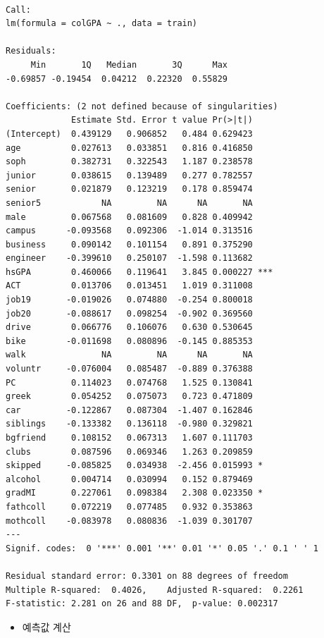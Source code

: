 \documentclass[
  letterpaper,
  DIV=11,
  numbers=noendperiod]{scrartcl}
\providecommand{\tightlist}{%
  \setlength{\itemsep}{0pt}\setlength{\parskip}{0pt}}\usepackage{longtable,booktabs,array}
\begin{document}
\begin{verbatim}

Call:
lm(formula = colGPA ~ ., data = train)

Residuals:
     Min       1Q   Median       3Q      Max 
-0.69857 -0.19454  0.04212  0.22320  0.55829 

Coefficients: (2 not defined because of singularities)
             Estimate Std. Error t value Pr(>|t|)    
(Intercept)  0.439129   0.906852   0.484 0.629423    
age          0.027613   0.033851   0.816 0.416850    
soph         0.382731   0.322543   1.187 0.238578    
junior       0.038615   0.139489   0.277 0.782557    
senior       0.021879   0.123219   0.178 0.859474    
senior5            NA         NA      NA       NA    
male         0.067568   0.081609   0.828 0.409942    
campus      -0.093568   0.092306  -1.014 0.313516    
business     0.090142   0.101154   0.891 0.375290    
engineer    -0.399610   0.250107  -1.598 0.113682    
hsGPA        0.460066   0.119641   3.845 0.000227 ***
ACT          0.013706   0.013451   1.019 0.311008    
job19       -0.019026   0.074880  -0.254 0.800018    
job20       -0.088617   0.098254  -0.902 0.369560    
drive        0.066776   0.106076   0.630 0.530645    
bike        -0.011698   0.080896  -0.145 0.885353    
walk               NA         NA      NA       NA    
voluntr     -0.076004   0.085487  -0.889 0.376388    
PC           0.114023   0.074768   1.525 0.130841    
greek        0.054252   0.075073   0.723 0.471809    
car         -0.122867   0.087304  -1.407 0.162846    
siblings    -0.133382   0.136118  -0.980 0.329821    
bgfriend     0.108152   0.067313   1.607 0.111703    
clubs        0.087596   0.069346   1.263 0.209859    
skipped     -0.085825   0.034938  -2.456 0.015993 *  
alcohol      0.004714   0.030994   0.152 0.879469    
gradMI       0.227061   0.098384   2.308 0.023350 *  
fathcoll     0.072219   0.077485   0.932 0.353863    
mothcoll    -0.083978   0.080836  -1.039 0.301707    
---
Signif. codes:  0 '***' 0.001 '**' 0.01 '*' 0.05 '.' 0.1 ' ' 1

Residual standard error: 0.3301 on 88 degrees of freedom
Multiple R-squared:  0.4026,    Adjusted R-squared:  0.2261 
F-statistic: 2.281 on 26 and 88 DF,  p-value: 0.002317
\end{verbatim}

\begin{itemize}
\tightlist
\item
  예측값 계산
\end{itemize}
\end{document}
